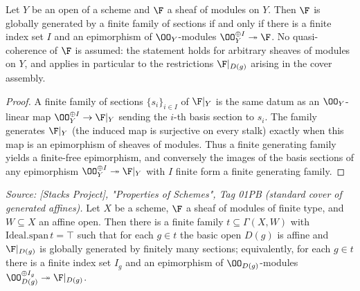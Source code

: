 \begin{lemma}
  \label{lem:gf_finite_gen_iff_free_epi}
  Let \(Y\) be an open of a scheme and \(\F\) a sheaf of modules on \(Y\). Then
  \(\F\) is globally generated by a finite family of sections if and only if there is a
  finite index set \(I\) and an epimorphism of \(\OO_Y\)-modules
  \(\OO_Y^{\oplus I} \twoheadrightarrow \F\). No quasi-coherence of \(\F\) is assumed:
  the statement holds for arbitrary sheaves of modules on \(Y\), and applies in particular
  to the restrictions \(\F|_{D(g)}\) arising in the cover assembly.
\end{lemma}

\begin{proof}
  A finite family of sections \(\{s_i\}_{i \in I}\) of \(\F|_Y\) is the same datum as an
  \(\OO_Y\)-linear map \(\OO_Y^{\oplus I} \to \F|_Y\) sending the \(i\)-th basis section to
  \(s_i\). The family generates \(\F|_Y\) (the induced map is surjective on every stalk)
  exactly when this map is an epimorphism of sheaves of modules. Thus a finite generating
  family yields a finite-free epimorphism, and conversely the images of the basis sections
  of any epimorphism \(\OO_Y^{\oplus I} \twoheadrightarrow \F|_Y\) with \(I\) finite form a
  finite generating family.
\end{proof}

\begin{lemma}
  \label{lem:gf_finiteType_affine_finite_cover_generated}
  \textit{Source: [Stacks Project], "Properties of Schemes", Tag 01PB (standard
  cover of generated affines).}
  Let \(X\) be a scheme, \(\F\) a sheaf of modules of finite type,
  and \(W \subseteq X\) an affine open. Then there is a finite family
  \(t \subseteq \Gamma(X, W)\) with \(\mathrm{Ideal.span}\,t = \top\) such that for
  each \(g \in t\) the basic open \(D(g)\) is affine and \(\F|_{D(g)}\) is globally
  generated by finitely many sections; equivalently, for each \(g \in t\) there is
  a finite index set \(I_g\) and an epimorphism of \(\OO_{D(g)}\)-modules
  \(\OO_{D(g)}^{\oplus I_g} \twoheadrightarrow \F|_{D(g)}\).
\end{lemma}


